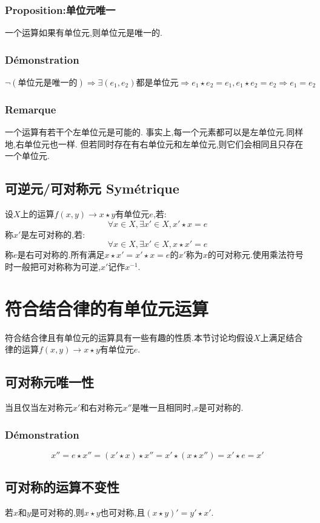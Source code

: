 \documentclass[12pt, a4paper, oneside]{ctexbook}
\begin{document}
  \subsubsection{Proposition:单位元唯一}
  一个运算如果有单位元,则单位元是唯一的.
  \subsubsection{Démonstration}
  $\lnot (\text{单位元是唯一的})\Rightarrow \exists (e_1,e_2)\text{都是单位元}\Rightarrow e_1\star e_2=e_1,e_1\star e_2=e_2\Rightarrow e_1=e_2$
  \subsubsection{Remarque}
  一个运算有若干个左单位元是可能的.
  事实上,每一个元素都可以是左单位元.同样地,右单位元也一样.
  但若同时存在有右单位元和左单位元,则它们会相同且只存在一个单位元.
  
  \subsection{可逆元/可对称元 Symétrique}
  设$X$上的运算$f(x,y)\rightarrow x\star y $有单位元$e$,若:
  $$
  \forall x\in X, \exists x'\in X,x'\star x=e
  $$
  称$x'$是左可对称的,若:
  $$
  \forall x\in X, \exists x'\in X,x\star x'=e
  $$
  称$e$是右可对称的.所有满足$x\star x'=x'\star x=e$的$x'$称为$x$的可对称元.使用乘法符号时一般把可对称称为可逆,$x'$记作$x^{-1}$.
  
  \section{符合结合律的有单位元运算}
  符合结合律且有单位元的运算具有一些有趣的性质.本节讨论均假设$X$上满足结合律的运算$f(x,y)\rightarrow x\star y $有单位元$e$.
  \subsection{可对称元唯一性}
  当且仅当左对称元$x'$和右对称元$x''$是唯一且相同时,$x$是可对称的.
  \subsubsection{Démonstration}
  $$
    x''=e\star x''=(x'\star x)\star x''=x'\star(x\star x'')=x'\star e=x'
  $$
  \subsection{可对称的运算不变性}
  若$x$和$y$是可对称的,则$x\star y$也可对称,且$(x\star y)'=y'\star x'$.
\end{document}
